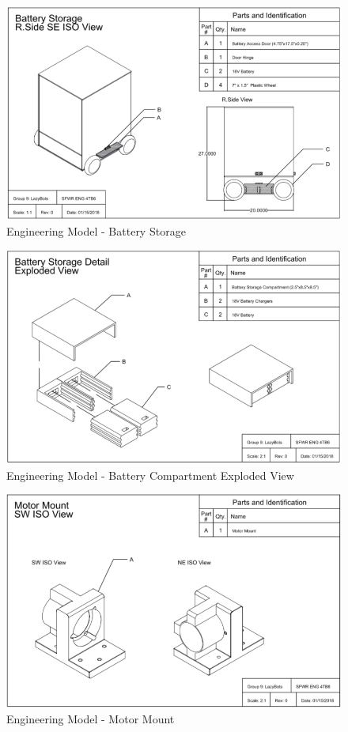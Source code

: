 \documentclass [10pt]{article}
\begin{document}
\begin{figure}[H]
	\centering
	\includegraphics [scale = 0.55] {figures/CAD_Battery_Storage.png}
	\caption{Engineering Model - Battery Storage}
\end{figure}
	
\begin{figure}[H]
	\centering
	\includegraphics [scale = 0.55] {figures/CAD_Battery.png}
	\caption{Engineering Model - Battery Compartment Exploded View}
\end{figure}

\begin{figure}[H]
	\centering
	\includegraphics [scale = 0.55] {figures/CAD_Motor_Mount.png}
	\caption{Engineering Model - Motor Mount}
\end{figure}
\end{document}
